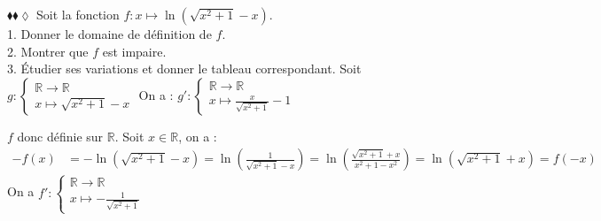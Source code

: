 \documentclass[11pt]{article}
\begin{document}
\begin{exercice}{$\blacklozenge\blacklozenge\lozenge$}{}
    Soit la fonction $f:x\mapsto\ln\left(\sqrt{x^2+1}-x\right)$.\\
    1. Donner le domaine de définition de $f$.\\
    2. Montrer que $f$ est impaire.\\
    3. Étudier ses variations et donner le tableau correspondant.
    \tcblower
     Soit $g:\begin{cases}\mathbb{R}\rightarrow\mathbb{R}\\x\mapsto\sqrt{x^2+1}-x\end{cases}$ On a : $g':\begin{cases}\mathbb{R}\rightarrow\mathbb{R}\\x\mapsto\frac{x}{\sqrt{x^2+1}}-1\end{cases}$
    \begin{center}
    \end{center}
    $f$ donc définie sur $\mathbb{R}$.\n
     Soit $x\in\mathbb{R}$, on a :
    \begin{align*}
        -f(x)&=-\ln\left(\sqrt{x^2+1}-x\right)
        =\ln\left(\frac{1}{\sqrt{x^2+1}-x}\right)
        =\ln\left(\frac{\sqrt{x^2+1}+x}{x^2+1-x^2}\right)
        =\ln\left(\sqrt{x^2+1}+x\right)
        =f(-x)
    \end{align*}
     On a $f':\begin{cases}\mathbb{R}\rightarrow\mathbb{R}\\x\mapsto-\frac{1}{\sqrt{x^2+1}}\end{cases}$\vspace*{0.2cm}
    \begin{center}
    \end{center}
\end{exercice}
\end{document}
